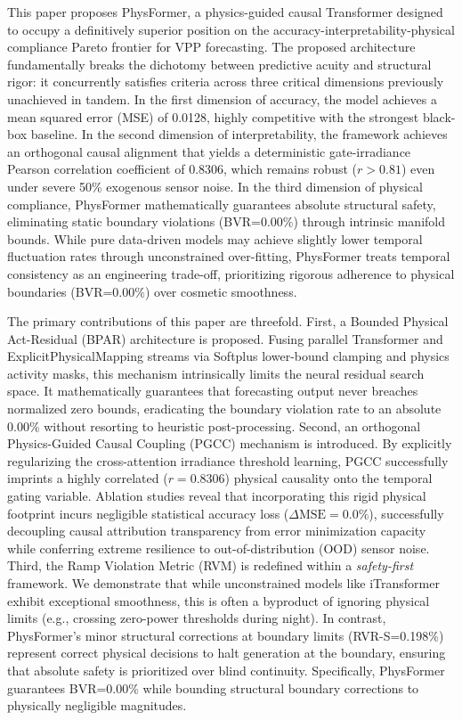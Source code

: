 This paper proposes PhysFormer, a physics-guided causal Transformer designed to occupy a definitively superior position on the accuracy-interpretability-physical compliance Pareto frontier for VPP forecasting. The proposed architecture fundamentally breaks the dichotomy between predictive acuity and structural rigor: it concurrently satisfies criteria across three critical dimensions previously unachieved in tandem. In the first dimension of accuracy, the model achieves a mean squared error (MSE) of 0.0128, highly competitive with the strongest black-box baseline. In the second dimension of interpretability, the framework achieves an orthogonal causal alignment that yields a deterministic gate-irradiance Pearson correlation coefficient of 0.8306, which remains robust ($r > 0.81$) even under severe 50\% exogenous sensor noise. In the third dimension of physical compliance, PhysFormer mathematically guarantees absolute structural safety, eliminating static boundary violations (BVR=0.00\%) through intrinsic manifold bounds. While pure data-driven models may achieve slightly lower temporal fluctuation rates through unconstrained over-fitting, PhysFormer treats temporal consistency as an engineering trade-off, prioritizing rigorous adherence to physical boundaries (BVR=0.00\%) over cosmetic smoothness.

The primary contributions of this paper are threefold. First, a Bounded Physical Act-Residual (BPAR) architecture is proposed. Fusing parallel Transformer and ExplicitPhysicalMapping streams via Softplus lower-bound clamping and physics activity masks, this mechanism intrinsically limits the neural residual search space. It mathematically guarantees that forecasting output never breaches normalized zero bounds, eradicating the boundary violation rate to an absolute 0.00\% without resorting to heuristic post-processing. Second, an orthogonal Physics-Guided Causal Coupling (PGCC) mechanism is introduced. By explicitly regularizing the cross-attention irradiance threshold learning, PGCC successfully imprints a highly correlated ($r=0.8306$) physical causality onto the temporal gating variable. Ablation studies reveal that incorporating this rigid physical footprint incurs negligible statistical accuracy loss ($\Delta\text{MSE}=0.0\%$), successfully decoupling causal attribution transparency from error minimization capacity while conferring extreme resilience to out-of-distribution (OOD) sensor noise. Third, the Ramp Violation Metric (RVM) is redefined within a \textit{safety-first} framework. We demonstrate that while unconstrained models like iTransformer exhibit exceptional smoothness, this is often a byproduct of ignoring physical limits (e.g., crossing zero-power thresholds during night). In contrast, PhysFormer's minor structural corrections at boundary limits (RVR-S=0.198\%) represent correct physical decisions to halt generation at the boundary, ensuring that absolute safety is prioritized over blind continuity. Specifically, PhysFormer guarantees BVR=0.00\% while bounding structural boundary corrections to physically negligible magnitudes.

